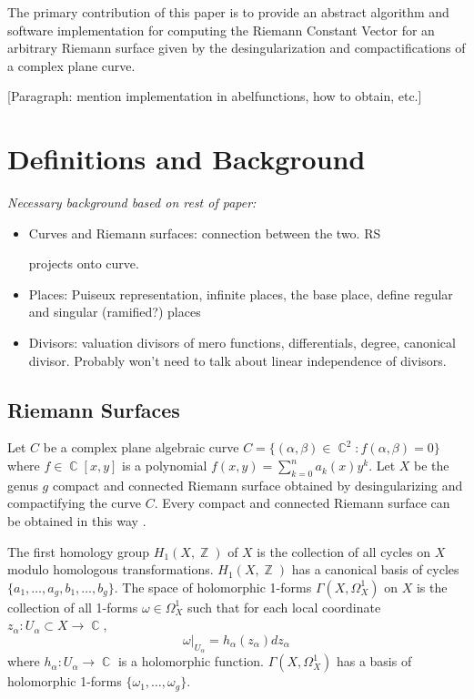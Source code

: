 \documentclass[12pt]{article}
\theoremstyle{definition}
\DeclareMathOperator{\ZZ}{\mathbb{Z}}
\DeclareMathOperator{\CC}{\mathbb{C}}
\begin{document}
The primary contribution of this paper is to provide an abstract
algorithm and software implementation for computing the Riemann Constant
Vector for an arbitrary Riemann surface given by the desingularization
and compactifications of a complex plane curve.

[Paragraph: mention implementation in abelfunctions, how to obtain,
  etc.]





\section{Definitions and Background}\label{sec:background}





{\it
Necessary background based on rest of paper:
\begin{itemize}
  \item Curves and Riemann surfaces: connection between the two. RS

    projects onto curve.
  \item Places: Puiseux representation, infinite places, the base place,
    define regular and singular (ramified?) places
  \item Divisors: valuation divisors of mero functions, differentials,
    degree, canonical divisor. Probably won't need to talk about linear
    independence of divisors.
\end{itemize}
}

\subsection{Riemann Surfaces}


Let $C$ be a complex plane algebraic curve $C = \{(\alpha,\beta) \in
\CC^2 : f(\alpha,\beta) = 0\}$ where $f \in \CC[x,y]$ is a polynomial
$f(x,y) = \sum_{k=0}^n a_k(x) y^k$. Let $X$ be the genus $g$ compact and
connected Riemann surface obtained by desingularizing and compactifying
the curve $C$. Every compact and connected Riemann surface can be
obtained in this way \cite{Griffiths89}.

The first homology group $H_1(X,\ZZ)$ of $X$ is the collection of all
cycles on $X$ modulo homologous transformations. $H_1(X,\ZZ)$ has a
canonical basis of cycles $\{a_1,\ldots,a_g,b_1,\ldots,b_g\}$. The space
of holomorphic 1-forms $\Gamma(X,\Omega_X^1)$ on $X$ is the collection
of all 1-forms $\omega \in \Omega_X^1$ such that for each local
coordinate $z_\alpha : U_\alpha \subset X \to \CC$,
\[
  \omega \big|_{U_\alpha}  = h_\alpha(z_\alpha) dz_\alpha
\]
where $h_\alpha : U_\alpha \to \CC$ is a holomorphic
function. $\Gamma(X,\Omega_X^1)$ has a basis of holomorphic 1-forms
$\{\omega_1, \ldots, \omega_g\}$.
\end{document}
